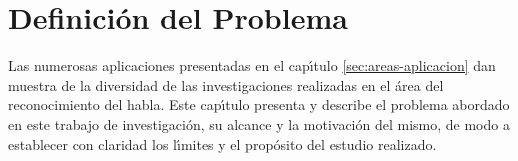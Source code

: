 \chapter{Definici\'on del Problema}
\label{sec:problema}
 
Las numerosas aplicaciones presentadas en el cap{\'\i}tulo \ref{sec:areas-aplicacion} dan muestra de la 
diversidad de las investigaciones realizadas en el \'area del reconocimiento del habla. 
Este cap{\'\i}tulo presenta y describe el problema abordado en este trabajo
de investigaci\'on, su alcance y la motivaci\'on del mismo, de modo a establecer con claridad los l{\'\i}mites
y el prop\'osito del estudio realizado.





